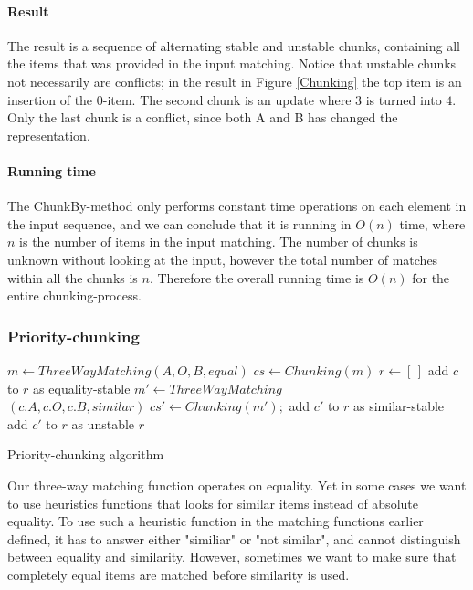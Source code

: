 \documentclass[11pt]{article}
\begin{document}

\paragraph{Result} The result is a sequence of alternating stable and unstable chunks, containing all the items that was provided in the input matching. Notice that unstable chunks not necessarily are conflicts; in the result in Figure \ref{Chunking} the top item is an insertion of the $0$-item. The second chunk is an update where $3$ is turned into $4$. Only the last chunk is a conflict, since both A and B has changed the representation. 

\paragraph{Running time} The ChunkBy-method only performs constant time operations on each element in the input sequence, and we can conclude that it is running in $O(n)$ time, where $n$ is the number of items in the input matching. The number of chunks is unknown without looking at the input, however the total number of matches within all the chunks is $n$. Therefore the overall running time is $O(n)$ for the entire chunking-process.

\subsubsection{Priority-chunking}
\label{PriorityDiff}

\begin{algorithm}
\begin{algorithmic}
	\State $m \gets ThreeWayMatching(A, O, B, equal)$
	\State $cs \gets Chunking(m)$
	\State $r \gets [\,]$
			\State add $c$ to $r$ as equality-stable
		\Else
			\State $m' \gets ThreeWayMatching $
			\State ~~~~~~~~~~~~~~~~~~~~~~~~~~~~ $ (c.A, c.O, c.B, similar)$
            \State $cs' \gets Chunking(m');$
					\State add $c'$ to $r$ as similar-stable
				\Else
					\State add $c'$ to $r$ as unstable
				\EndIf
			\EndFor
		\EndIf
	\EndFor
	\State \Return $r$
\EndFunction
\end{algorithmic}
	\caption{Priority-chunking algorithm}
	\label{PriorityChunk}
\end{algorithm}

Our three-way matching function operates on equality. Yet in some cases we want to use heuristics functions that looks for similar items instead of absolute equality. To use such a heuristic function in the matching functions earlier defined, it has to answer either "similiar" or "not similar", and cannot distinguish between equality and similarity. However, sometimes we want to make sure that completely equal items are matched before similarity is used.
\end{document}
